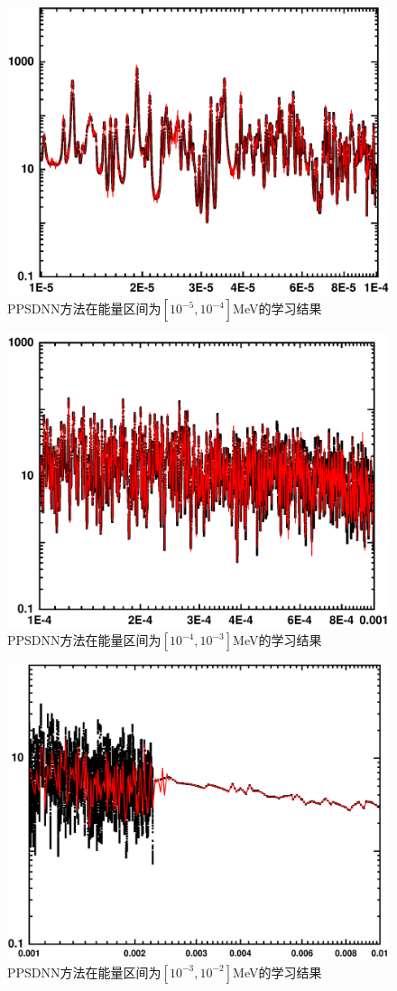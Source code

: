 \begin{figure}[htbp!]
  \centering
  \includegraphics[width=0.84\linewidth]{figures/endftrain/G5.pdf}
  \caption{PPSDNN方法在能量区间为$[10^{-5},10^{-4}]$MeV的学习结果}
  \label{endf5}
\end{figure}
\begin{figure}[htbp!]
  \centering
  \includegraphics[width=0.84\linewidth]{figures/endftrain/G4.pdf}
  \caption{PPSDNN方法在能量区间为$[10^{-4},10^{-3}]$MeV的学习结果}
  \label{endf4}
\end{figure}
\begin{figure}[htbp!]
  \centering
  \includegraphics[width=0.84\linewidth]{figures/endftrain/G3.pdf}
  \caption{PPSDNN方法在能量区间为$[10^{-3},10^{-2}]$MeV的学习结果}
  \label{endf3}
\end{figure}
